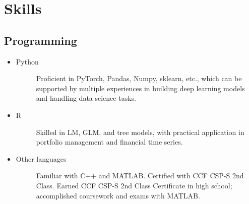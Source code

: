 \documentclass[a4paper]{article}
\begin{document}

\section{Skills}

\subsection{Programming}
\begin{itemize}
    \item\begin{description}
            \item[Python] Proficient in PyTorch, Pandas, Numpy, sklearn, etc., which can be supported by multiple experiences in building deep learning models and handling data science tasks.
    \end{description}
    \item\begin{description}
        \item[R] Skilled in LM, GLM, and tree models, with practical application in portfolio management and financial time series.
    \end{description}
    \item \begin{description}
        \item[Other languages] Familiar with C++ and MATLAB. Certified with CCF CSP-S 2nd Class. 
        Earned CCF CSP-S 2nd Class Certificate in high school; accomplished coursework and exams with MATLAB.
    \end{description}
\end{itemize}
\end{document}
